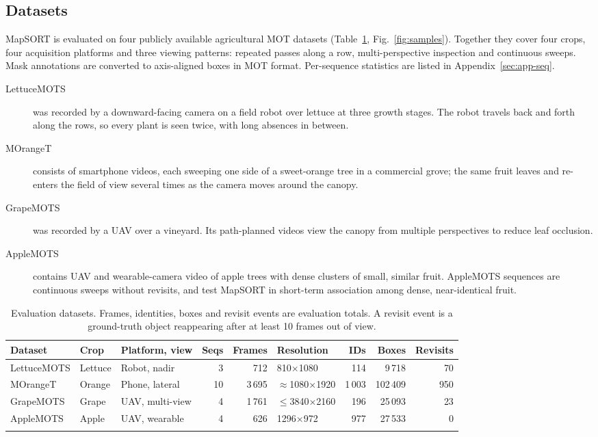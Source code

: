 \documentclass[pdflatex,sn-basic]{sn-jnl}%
\theoremstyle{thmstyleone}%
\begin{document}
\subsection{Datasets}\label{sec:datasets}

MapSORT is evaluated on four publicly available agricultural MOT datasets (Table~\ref{tab:datasets}, Fig.~\ref{fig:samples}). Together they cover four crops, four acquisition platforms and three viewing patterns: repeated passes along a row, multi-perspective inspection and continuous sweeps. Mask annotations are converted to axis-aligned boxes in MOT format. Per-sequence statistics are listed in Appendix~\ref{sec:app-seq}.

\begin{description}
\item[LettuceMOTS] \citep{hu2024lettucemots} was recorded by a downward-facing camera on a field robot over lettuce at three growth stages. The robot travels back and forth along the rows, so every plant is seen twice, with long absences in between.
\item[MOrangeT] \citep{santos2024moranget} consists of smartphone videos, each sweeping one side of a sweet-orange tree in a commercial grove; the same fruit leaves and re-enters the field of view several times as the camera moves around the canopy.
\item[GrapeMOTS] \citep{arizasentis2024grapemots} was recorded by a UAV over a vineyard. Its path-planned videos view the canopy from multiple perspectives to reduce leaf occlusion.
\item[AppleMOTS] \citep{dejong2022applemots} contains UAV and wearable-camera video of apple trees with dense clusters of small, similar fruit. AppleMOTS sequences are continuous sweeps without revisits, and test MapSORT in short-term association among dense, near-identical fruit.
\end{description}

\begin{table}[t]
\caption{Evaluation datasets. Frames, identities, boxes and revisit events are evaluation totals. A revisit event is a ground-truth object reappearing after at least 10 frames out of view.}\label{tab:datasets}
\footnotesize
\setlength{\tabcolsep}{3pt}
\begin{tabular*}{\textwidth}{@{\extracolsep\fill}lllrrlrrr@{}}
\toprule
Dataset & Crop & Platform, view & Seqs & Frames & Resolution & IDs & Boxes & Revisits \\
\midrule
LettuceMOTS & Lettuce & Robot, nadir & 3 & 712 & 810$\times$1080 & 114 & 9\,718 & 70 \\
MOrangeT & Orange & Phone, lateral & 10 & 3\,695 & $\approx$1080$\times$1920 & 1\,003 & 102\,409 & 950 \\
GrapeMOTS & Grape & UAV, multi-view & 4 & 1\,761 & $\le$3840$\times$2160 & 196 & 25\,093 & 23 \\
AppleMOTS & Apple & UAV, wearable & 4 & 626 & 1296$\times$972 & 977 & 27\,533 & 0 \\
\botrule
\end{tabular*}
\end{table}
\end{document}
